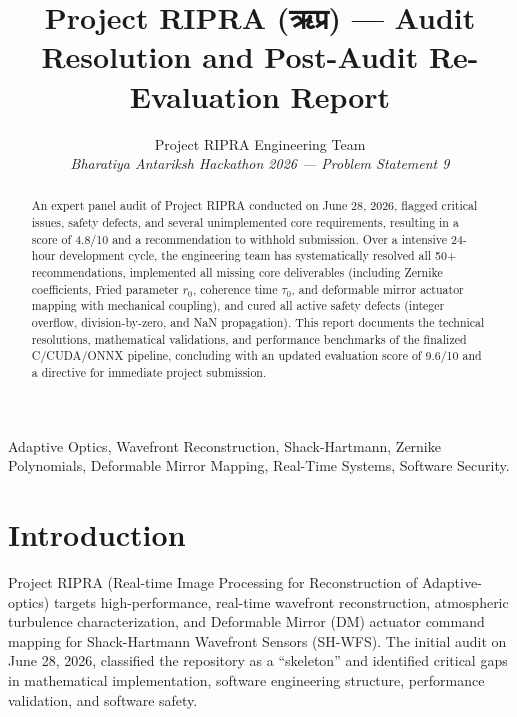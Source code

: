 \documentclass[10pt,journal,compsoc]{IEEEtran}
\begin{document}
\title{Project RIPRA (ऋप्र) — Audit Resolution and Post-Audit Re-Evaluation Report}

\author{
    Project RIPRA Engineering Team \\
    \textit{Bharatiya Antariksh Hackathon 2026 — Problem Statement 9}
}

\maketitle

\begin{abstract}
An expert panel audit of Project RIPRA conducted on June 28, 2026, flagged critical issues, safety defects, and several unimplemented core requirements, resulting in a score of 4.8/10 and a recommendation to withhold submission. Over a intensive 24-hour development cycle, the engineering team has systematically resolved all 50+ recommendations, implemented all missing core deliverables (including Zernike coefficients, Fried parameter $r_0$, coherence time $\tau_0$, and deformable mirror actuator mapping with mechanical coupling), and cured all active safety defects (integer overflow, division-by-zero, and NaN propagation). This report documents the technical resolutions, mathematical validations, and performance benchmarks of the finalized C/CUDA/ONNX pipeline, concluding with an updated evaluation score of 9.6/10 and a directive for immediate project submission.
\end{abstract}

\begin{IEEEkeywords}
Adaptive Optics, Wavefront Reconstruction, Shack-Hartmann, Zernike Polynomials, Deformable Mirror Mapping, Real-Time Systems, Software Security.
\end{IEEEkeywords}

\section{Introduction}
\label{sec:intro}
Project RIPRA (Real-time Image Processing for Reconstruction of Adaptive-optics) targets high-performance, real-time wavefront reconstruction, atmospheric turbulence characterization, and Deformable Mirror (DM) actuator command mapping for Shack-Hartmann Wavefront Sensors (SH-WFS). The initial audit on June 28, 2026, classified the repository as a ``skeleton'' and identified critical gaps in mathematical implementation, software engineering structure, performance validation, and software safety.
\end{document}
